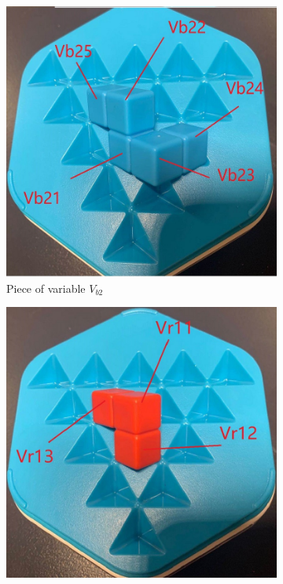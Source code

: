 \begin{figure}[htbp]
\begin{subfigure}[b]{0.25\textwidth}
\includegraphics[width=\textwidth]{figs/3Dblue2.jpg}
\caption{Piece of variable $V_{b2}$}
  \label{fig:3Dblue2}
\end{subfigure}
\begin{subfigure}[b]{0.25\textwidth}
\centering
\includegraphics[width=\textwidth]{figs/3Dred1.jpg}

\end{subfigure}
\end{figure}
